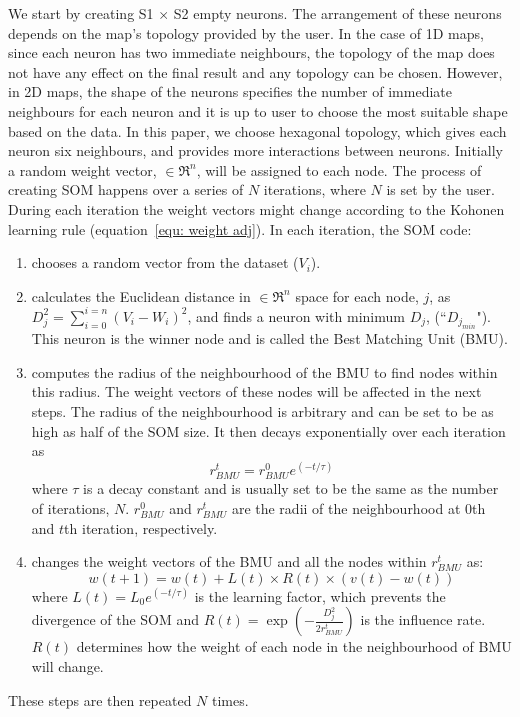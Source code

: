      We start by creating S1 $\times$ S2 empty neurons. 
     The arrangement of these neurons depends on the map's topology provided by the user. 
     In the case of 1D maps, since each neuron has two immediate neighbours, the topology of the map does not have any effect on the final result and any topology can be chosen.
     However, in 2D maps, the shape of the neurons specifies the number of immediate neighbours for each neuron and it is up to user to choose the most suitable shape based on the data.
     In this paper, we choose hexagonal topology, which gives each neuron six neighbours, and provides more interactions between neurons.
     Initially a random weight vector,  $\in \Re^n$, will be assigned to each node.
     The process of creating SOM happens over a series of $N$ iterations, where $N$ is set by the user. 
     During each iteration the weight vectors might change according to the Kohonen learning rule (equation~\ref{equ: weight adj}). 
      In each iteration, the SOM code:
     \begin{enumerate}
        \item chooses a random vector from the dataset ($V_i$).
        \item calculates the Euclidean distance in $\in \Re^n$ space for each node, $j$, as  $D_j^2= \sum_{i=0}^{i=n} (V_i - W_i)^2$, and finds a neuron with minimum $D_j$, (``$D_{j_{min}}$"). This neuron is the winner node and is called the Best Matching Unit (BMU). 
        \item  computes the radius of the neighbourhood of the BMU to find nodes within this radius. The weight vectors of these nodes will be affected in the next steps. The radius of the neighbourhood is arbitrary and can be set to be as high as half of the SOM size. It then decays exponentially over each iteration as
        \begin{equation}
            r^t_{BMU} = r^0_{BMU}e^{(-t/\tau)}
        \end{equation}
        where $\tau$ is a decay constant and is usually set to be the same as the number of iterations, $N$. $r^0_{BMU}$ and $r^t_{BMU}$ are the radii of the neighbourhood at 0th and $t$th iteration, respectively. 
        \item changes the weight vectors of the BMU and all the nodes within $r^t_{BMU}$ as:
        \begin{equation}
            \label{equ: weight adj}
            w(t+1)=w(t)+L(t) \times R(t) \times(v(t)-w(t))
        \end{equation}
        where $L(t) = L_0 e^{(-t/\tau)}$ is the learning factor, which prevents the divergence of the SOM and $R(t)=\exp(-\frac{D_j^2}{2r^t_{BMU}})$ is the influence rate. $R(t)$ determines how the weight of each node in the neighbourhood of BMU will change.
     \end{enumerate}
     These steps are then repeated $N$ times.
     
